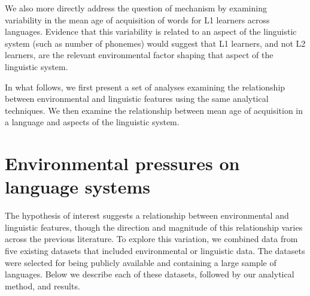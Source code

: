 \documentclass[10pt,letterpaper]{article}
\begin{document}
We also more directly address the question of mechanism by examining variability in the mean age of acquisition of words for L1 learners across languages. Evidence that this variability is related to an aspect of the linguistic system (such as number of phonemes) would suggest that L1 learners, and not L2 learners, are the relevant environmental factor shaping that aspect of the linguistic system. 

In what follows, we first present a set of analyses examining the relationship between environmental and linguistic features using the same analytical techniques.  We then examine the relationship between mean age of acquisition in a language and aspects of the linguistic system.



\section{Environmental pressures on language systems}
The hypothesis of interest suggests a relationship between environmental and linguistic features, though the direction  and magnitude of this relationship varies across the previous literature. To explore this variation, we combined data from five existing datasets that included environmental or linguistic data. The datasets were selected for being publicly available and containing a large sample of languages. Below we describe each of these datasets, followed by our analytical method, and results.
\end{document}
